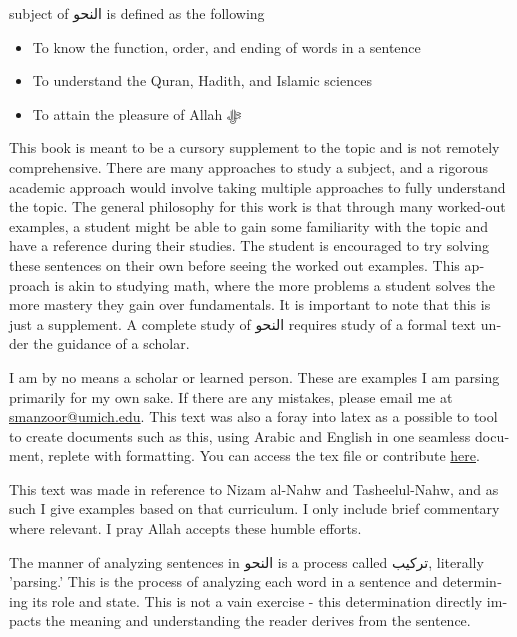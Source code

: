 \documentclass[../main.tex]{subfiles}
\begin{document}
\begin{english}
     subject of \textarabic{النحو} is defined as the following
    \begin{itemize}
        \item To know the function, order, and ending of words in a sentence
        \item To understand the Quran, Hadith, and Islamic sciences
        \item To attain the pleasure of Allah ﷻ
    \end{itemize}
    This book is meant to be a cursory supplement to the topic and is not remotely comprehensive. There are many approaches to study a subject, and a rigorous academic approach would involve taking multiple approaches to fully understand the topic. The general philosophy for this work is that through many worked-out examples, a student might be able to gain some familiarity with the topic and have a reference during their studies. The student is encouraged to try solving these sentences on their own before seeing the worked out examples. This approach is akin to studying math, where the more problems a student solves the more mastery they gain over fundamentals. It is important to note that this is just a supplement. A complete study of \textarabic{النحو} requires study of a formal text under the guidance of a scholar.

    I am by no means a scholar or learned person. These are examples I am parsing primarily for my own sake. If there are any mistakes, please email me at \href{mailto:smanzoor@umich.edu}{smanzoor@umich.edu}. This text was also a foray into latex as a possible to tool to create documents such as this, using Arabic and English in one seamless document, replete with formatting. You can access the tex file or contribute \href{https://github.com/Yoyomanzoor/alnahw-bilmiran}{here}.

    This text was made in reference to Nizam al-Nahw\supercite{nizam} and Tasheelul-Nahw\supercite{tasheel}, and as such I give examples based on that curriculum. I only include brief commentary where relevant. I pray Allah accepts these humble efforts.
    
    The manner of analyzing sentences in \textarabic{النحو} is a process called \textarabic{تركيب}, literally 'parsing.' This is the process of analyzing each word in a sentence and determining its role and state. This is not a vain exercise - this determination directly impacts the meaning and understanding the reader derives from the sentence.
\end{english}

\pagebreak
\end{document}
